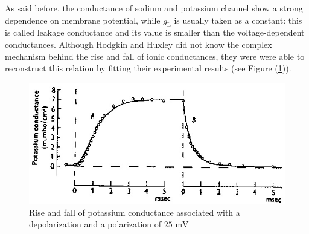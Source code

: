 \documentclass[a4paper,11pt ]{report}
\theoremstyle{definition}
\begin{document}
 As said before, the conductance of sodium and potassium channel show a strong dependence on membrane potential, while $g_\text{L}$ is usually taken as a constant: this is called leakage conductance and its value is smaller than the voltage-dependent conductances. Although Hodgkin and Huxley did not know the complex mechanism behind the rise and fall of ionic conductances, they were were able to reconstruct this relation by fitting their experimental results (see Figure (\ref{rise_fall_potassium})).\\
\begin{figure}[h!]
\centering
\includegraphics[scale=0.7]{rise_fall_potassium}
\caption{\small Rise and fall of potassium conductance associated with a depolarization and a polarization of $25\text{ mV}$}
\label{rise_fall_potassium}
\end{figure}
\end{document}
